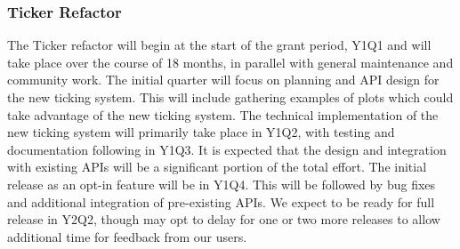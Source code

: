 \documentclass[12pt]{article}
\numberwithin{page}{section}
\begin{document}
\subsubsection{Ticker Refactor}

The Ticker refactor will begin at the start of the grant period, Y1Q1 and will take place over the course of 18 months, in parallel with general maintenance and community work.
The initial quarter will focus on planning and API design for the new ticking system.
This will include gathering examples of plots which could take advantage of the new ticking system.
The technical implementation of the new ticking system will primarily take place in Y1Q2, with testing and documentation following in Y1Q3.
It is expected that the design and integration with existing APIs will be a significant portion of the total effort.
The initial release as an opt-in feature will be in Y1Q4.
This will be followed by bug fixes and additional integration of pre-existing APIs.
We expect to be ready for full release in Y2Q2, though may opt to delay for one or two more releases to allow additional time for feedback from our users.

\end{document}
